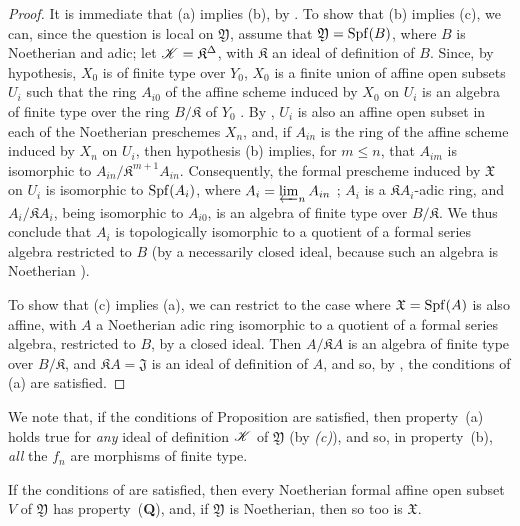 \begin{proof}
\label{proof-1.10.13.1}
It is immediate that (a) implies (b), by .
To show that (b) implies (c), we can, since the question is local on $\mathfrak{Y}$, assume that $\mathfrak{Y}=\operatorname{Spf}(B)$, where $B$ is Noetherian and adic;
let $\mathscr{K}=\mathfrak{K}^\Delta$, with $\mathfrak{K}$ an ideal of definition of $B$.
Since, by hypothesis, $X_0$ is of finite type over $Y_0$, $X_0$ is a finite union of affine open subsets $U_i$ such that the ring $A_{i0}$ of the affine scheme induced by $X_0$ on $U_i$ is an algebra of finite type over the ring $B/\mathfrak{K}$ of $Y_0$ .
By , $U_i$ is also an affine open subset in each of the Noetherian preschemes $X_n$, and, if $A_{in}$ is the ring of the affine scheme induced by $X_n$ on $U_i$, then hypothesis (b) implies, for $m\leq n$, that $A_{im}$ is isomorphic to $A_{in}/\mathfrak{K}^{m+1}A_{in}$.
Consequently, the formal prescheme induced by $\mathfrak{X}$ on $U_i$ is isomorphic to $\operatorname{Spf}(A_i)$, where $A_i=\varprojlim_n A_{in}$ ;
$A_i$ is a $\mathfrak{K}A_i$-adic ring, and $A_i/\mathfrak{K}A_i$, being isomorphic to $A_{i0}$, is an algebra of finite type over $B/\mathfrak{K}$.
We thus conclude  that $A_i$ is topologically isomorphic to a quotient of a formal series algebra restricted to $B$ (by a necessarily closed ideal, because such an algebra is Noetherian ).

To show that (c) implies (a), we can restrict to the case where $\mathfrak{X}=\operatorname{Spf}(A)$ is also affine, with $A$ a Noetherian adic ring isomorphic to a quotient of a formal series algebra, restricted to $B$, by a closed ideal.
Then  $A/\mathfrak{K}A$ is an algebra of finite type over $B/\mathfrak{K}$, and $\mathfrak{K}A=\mathfrak{J}$ is an ideal of definition of $A$, and so, by , the conditions of (a) are satisfied.
\end{proof}

We note that, if the conditions of Proposition  are satisfied, then property~(a) holds true for \emph{any} ideal of definition $\mathscr{K}$ of $\mathfrak{Y}$ (by \emph{(c)}), and so, in property~(b), \emph{all} the $f_n$ are morphisms of finite type.

\begin{corollary}[10.13.2]
\label{1.10.13.2}
If the conditions of  are satisfied, then every Noetherian formal affine open subset $V$ of $\mathfrak{Y}$ has property~(\textbf{Q}), and, if $\mathfrak{Y}$ is Noetherian, then so too is $\mathfrak{X}$.
\end{corollary}

